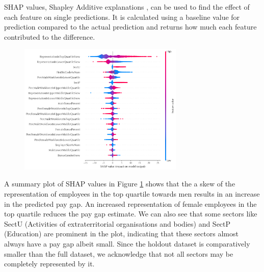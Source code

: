 SHAP values, Shapley Additive explanations \cite{Lundberg2017}, can be used to find the effect of each feature on single predictions. It is calculated using a baseline value for prediction compared to the actual prediction and returns how much each feature contributed to the difference.

\begin{figure}
    \centering
    \includegraphics[width=0.7\textwidth]{images/median-shap.png}
    \label{fig:shap-median-rf}
\end{figure}

A summary plot of SHAP values in Figure \ref{fig:shap-median-rf} shows that the a skew of the representation of employees in the top quartile towards men results in an increase in the predicted pay gap. An increased representation of female employees in the top quartile reduces the pay gap estimate. We can also see that some sectors like SectU (Activities of extraterritorial organisations and bodies) and SectP (Education) are prominent in the plot, indicating that these sectors almost always have a pay gap albeit small. Since the holdout dataset is comparatively smaller than the full dataset, we acknowledge that not all sectors may be completely represented by it.


